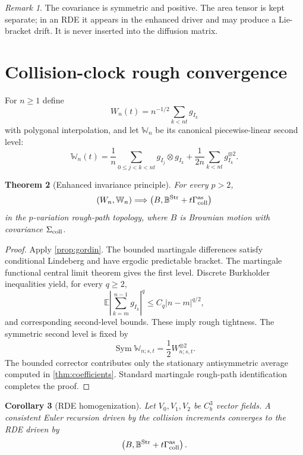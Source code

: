 \documentclass[11pt,reqno]{amsart}
\newtheorem{theorem}{Theorem}[section]
\newtheorem{corollary}[theorem]{Corollary}
\theoremstyle{definition}
\theoremstyle{remark}
\newtheorem{remark}[theorem]{Remark}
\newcommand{\E}{\mathbb E}
\newcommand{\abs}[1]{\left\lvert #1\right\rvert}
\begin{document}
\begin{remark}
The covariance is symmetric and positive.  The area tensor is kept separate;
in an RDE it appears in the enhanced driver and may produce a Lie-bracket
drift.  It is never inserted into the diffusion matrix.
\end{remark}

\section{Collision-clock rough convergence}\label{sec:collision-rough}

For $n\ge1$ define
\[
 W_n(t)=n^{-1/2}\sum_{k<nt}g_{I_k}
\]
with polygonal interpolation, and let $\mathbb W_n$ be its canonical
piecewise-linear second level:
\[
 \mathbb W_n(t)
 =
 \frac1n\sum_{0\le j<k<nt}g_{I_j}\otimes g_{I_k}
 +\frac1{2n}\sum_{k<nt}g_{I_k}^{\otimes2}.
\]

\begin{theorem}[Enhanced invariance principle]\label{thm:rough}
For every $p>2$,
\[
 (W_n,\mathbb W_n)
 \Longrightarrow
 \left(B,\mathbb B^{\rm Str}
 +t\Gamma_{\rm coll}^{\rm as}\right)
\]
in the $p$-variation rough-path topology, where $B$ is Brownian motion with
covariance $\Sigma_{\rm coll}$.
\end{theorem}

\begin{proof}
Apply \cref{prop:gordin}.  The bounded martingale differences satisfy
conditional Lindeberg and have ergodic predictable bracket.  The martingale
functional central limit theorem gives the first level.  Discrete
Burkholder inequalities yield, for every $q\ge2$,
\[
 \E\abs{\sum_{k=m}^{n-1}g_{I_k}}^q
 \le C_q\abs{n-m}^{q/2},
\]
and corresponding second-level bounds.  These imply rough tightness.
The symmetric second level is fixed by
\[
 \operatorname{Sym}\mathbb W_{n;s,t}
 =\frac12W_{n;s,t}^{\otimes2}.
\]
The bounded corrector contributes only the stationary antisymmetric average
computed in \cref{thm:coefficients}.  Standard martingale rough-path
identification completes the proof.
\end{proof}

\begin{corollary}[RDE homogenization]\label{cor:rde}
Let $V_0,V_1,V_2$ be $C_b^3$ vector fields.  A consistent Euler recursion
driven by the collision increments converges to the RDE driven by
\[
 \left(B,\mathbb B^{\rm Str}
 +t\Gamma_{\rm coll}^{\rm as}\right).
\]
\end{corollary}
\end{document}
